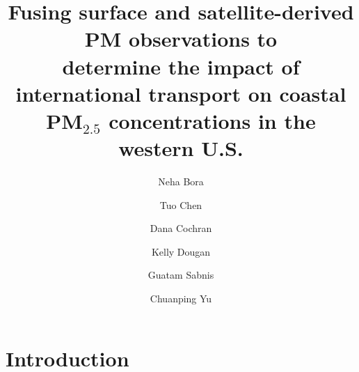 \documentclass[notheorems,envcountsect,allowframebreaks,xcolor=svgnames,8pt]{beamer}
\title[Fusing AOD and PM$2.5$ datasets]
{Fusing surface and satellite-derived PM observations to \\ determine the impact of international transport on coastal PM$_{2.5}$ concentrations in the western U.S.}
\author
{Neha Bora \and Tuo Chen \and Dana Cochran \and Kelly Dougan \and Guatam Sabnis \and Chuanping Yu}
\institute[SAMSI]
{Industrial Math/Stat Modeling Workshop \\ Environmental Protection Agency}
\begin{document}
\begin{frame}
\titlepage
\end{frame}

\section{Introduction}

\end{document}
